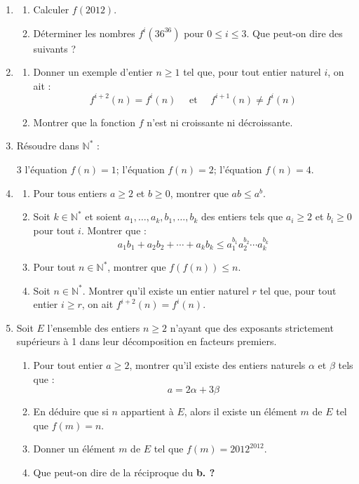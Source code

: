 \documentclass[landscape,twocolumn,leqno,a4paper,10pt]{report} %
\renewcommand{\geq}{\geqslant}
\renewcommand{\leq}{\leqslant}
\renewcommand{\textbf}[1]{\begingroup\bfseries\mathversion{bold}#1\endgroup}		%
\begin{document}
\begin{enumerate}
	\item \begin{enumerate}
		\item Calculer $f(2012)$.
		\item Déterminer les nombres $f^{i}\left(36^{36}\right)$ pour $0 \leq i \leq 3$. Que peut-on dire des suivants ?
	\end{enumerate}
	\item \begin{enumerate}
		\item Donner un exemple d'entier $n \geq 1$ tel que, pour tout entier naturel $i$, on ait :
		$$f^{i+2}(n)=f^{i}(n) \quad \text { et } \quad f^{i+1}(n) \neq f^{i}(n)$$
		\item Montrer que la fonction $f$ n'est ni croissante ni décroissante.
	\end{enumerate}
	\item Résoudre dans $\mathbb{N}^{*}$ :
	\begin{hlist}[label=\alpha{hlisti}.]3
		\hitem l'équation $f(n)=1$;
		\hitem l'équation $f(n)=2$;
		\hitem l'équation $f(n)=4$.
	\end{hlist}
	\item \begin{enumerate}
		\item Pour tous entiers $a \geq 2$ et $b \geq 0$, montrer que $a b \leq a^{b}$.
		\item Soit $k \in \mathbb{N}^{*}$ et soient $a_{1}, \ldots, a_{k}, b_{1}, \ldots, b_{k}$ des entiers tels que $a_{i} \geq 2$ et $b_{i} \geq 0$ pour tout $i$. Montrer que :
		$$a_{1} b_{1}+a_{2} b_{2}+\cdots+a_{k} b_{k} \leq a_{1}^{b_{1}} a_{2}^{b_{2}} \cdots a_{k}^{b_{k}}$$
		\item Pour tout $n \in \mathbb{N}^{*}$, montrer que $f(f(n)) \leq n$.
		\item Soit $n \in \mathbb{N}^{*}$. Montrer qu'il existe un entier naturel $r$ tel que, pour tout entier $i \geq r$, on ait $f^{i+2}(n)=f^{i}(n)$.
	\end{enumerate}
	\item Soit $E$ l'ensemble des entiers $n \geq 2$ n'ayant que des exposants strictement supérieurs à 1 dans leur décomposition en facteurs premiers.
	\begin{enumerate}
		\item Pour tout entier $a \geq 2$, montrer qu'il existe des entiers naturels $\alpha$ et $\beta$ tels que :
		$$a=2 \alpha+3 \beta$$
		\item En déduire que si $n$ appartient à $E$, alors il existe un élément $m$ de $E$ tel que $f(m)=n$.
		\item Donner un élément $m$ de $E$ tel que $f(m)=2012^{2012}$.
		\item Que peut-on dire de la réciproque du \textbf{b.} ?
	\end{enumerate}
\end{enumerate}
\end{document}
